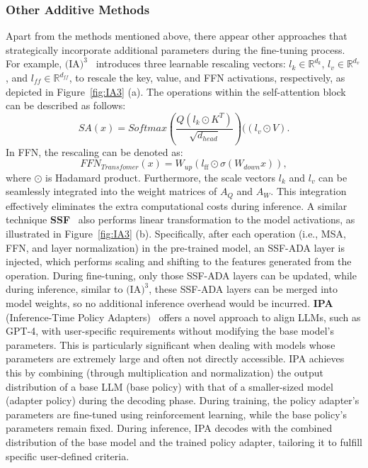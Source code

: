 \subsubsection{Other Additive Methods}
Apart from the methods mentioned above, there appear other approaches that strategically incorporate additional parameters during the fine-tuning process. For example, \textbf{$\text{(IA)}^3$}~\cite{16-few-shot-peft-in-context-learning} introduces three learnable rescaling vectors: $l_k \in \mathbb{R}^{d_k}$, $l_v \in \mathbb{R}^{d_v}$, and $l_{ff} \in \mathbb{R}^{d_{ff}}$, to rescale the key, value, and FFN activations, respectively, as depicted in Figure~\ref{fig:IA3} (a). The operations within the self-attention block can be described as follows:
\begin{equation}
    SA(x) = Softmax(\frac{Q (l_k \odot K^T)}{\sqrt{d_{head}}}) ((l_v \odot V).
    \label{subeq:query2}
\end{equation}
In FFN, the rescaling can be denoted as:
\begin{equation}
    FFN_{Transfomer}(x) = W_{up}(l_{\text{ff}} \odot \sigma( W_{down} x)),
\end{equation}
where $\odot$ is Hadamard product. Furthermore, the scale vectors $l_k$ and $l_v$ can be seamlessly integrated into the weight matrices of $A_Q$ and $A_W$. This integration effectively eliminates the extra computational costs during inference. A similar technique \textbf{SSF}~\cite{ssf} also performs linear transformation to the model activations, as illustrated in Figure~\ref{fig:IA3} (b). Specifically, after each operation (i.e., MSA, FFN, and layer normalization) in the pre-trained model, an SSF-ADA layer is injected, which performs scaling and shifting to the features generated from the operation. During fine-tuning, only those SSF-ADA layers can be updated, while during inference, similar to $\text{(IA)}^3$, these SSF-ADA layers can be merged into model weights, so no additional inference overhead would be incurred. 
\textbf{IPA} (Inference-Time Policy Adapters)~\cite{IPA} offers a novel approach to align LLMs, such as GPT-4, with user-specific requirements without modifying the base model's parameters. This is particularly significant when dealing with models whose parameters are extremely large and often not directly accessible. IPA achieves this by combining (through multiplication and normalization) the output distribution of a base LLM (base policy) with that of a smaller-sized model (adapter policy) during the decoding phase. During training, the policy adapter's parameters are fine-tuned using reinforcement learning, while the base policy's parameters remain fixed. During inference, IPA decodes with the combined distribution of the base model and the trained policy adapter, tailoring it to fulfill specific user-defined criteria.





